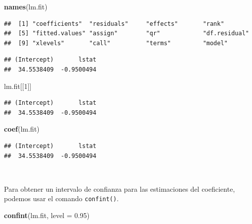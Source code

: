 \documentclass[]{book}
\newenvironment{Shaded}{\begin{snugshade}}{\end{snugshade}}
\newcommand{\KeywordTok}[1]{\textcolor[rgb]{0.13,0.29,0.53}{\textbf{#1}}}
\newcommand{\DataTypeTok}[1]{\textcolor[rgb]{0.13,0.29,0.53}{#1}}
\newcommand{\DecValTok}[1]{\textcolor[rgb]{0.00,0.00,0.81}{#1}}
\newcommand{\FloatTok}[1]{\textcolor[rgb]{0.00,0.00,0.81}{#1}}
\newcommand{\OperatorTok}[1]{\textcolor[rgb]{0.81,0.36,0.00}{\textbf{#1}}}
\newcommand{\NormalTok}[1]{#1}
\begin{document}
\begin{Shaded}
\begin{Highlighting}[]
\KeywordTok{names}\NormalTok{(lm.fit)}
\end{Highlighting}
\end{Shaded}

\begin{verbatim}
##  [1] "coefficients"  "residuals"     "effects"       "rank"         
##  [5] "fitted.values" "assign"        "qr"            "df.residual"  
##  [9] "xlevels"       "call"          "terms"         "model"
\end{verbatim}

\begin{Shaded}
\end{Shaded}

\begin{verbatim}
## (Intercept)       lstat 
##  34.5538409  -0.9500494
\end{verbatim}

\begin{Shaded}
\begin{Highlighting}[]
\NormalTok{lm.fit[[}\DecValTok{1}\NormalTok{]]}
\end{Highlighting}
\end{Shaded}

\begin{verbatim}
## (Intercept)       lstat 
##  34.5538409  -0.9500494
\end{verbatim}

\begin{Shaded}
\begin{Highlighting}[]
\KeywordTok{coef}\NormalTok{(lm.fit)}
\end{Highlighting}
\end{Shaded}

\begin{verbatim}
## (Intercept)       lstat 
##  34.5538409  -0.9500494
\end{verbatim}

~

Para obtener un intervalo de confianza para las estimaciones del
coeficiente, podemos usar el comando \texttt{confint()}.

\begin{Shaded}
\begin{Highlighting}[]
\KeywordTok{confint}\NormalTok{(lm.fit, }\DataTypeTok{level =} \FloatTok{0.95}\NormalTok{)}
\end{Highlighting}
\end{Shaded}
\end{document}
